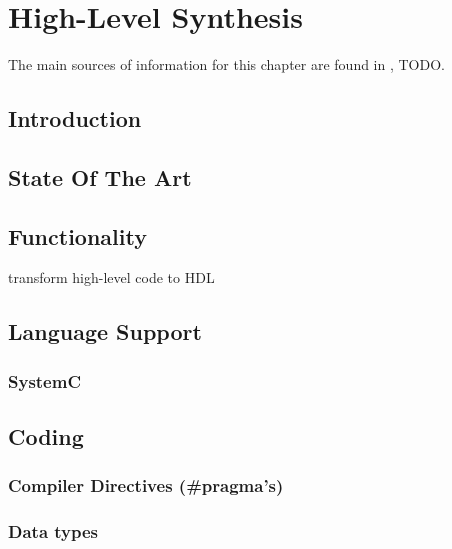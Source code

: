 \chapter{High-Level Synthesis}
\label{cha:HLS}

The main sources of information for this chapter are found in \cite{VivadoUgHLS}, TODO.

\section{Introduction}

\section{State Of The Art}

\section{Functionality}
transform high-level code to HDL

\section{Language Support}


\subsection{\cplusplus}

\subsection{SystemC}

\section{Coding}

\subsection{Compiler Directives (\#pragma's)}

\subsection{Data types}

